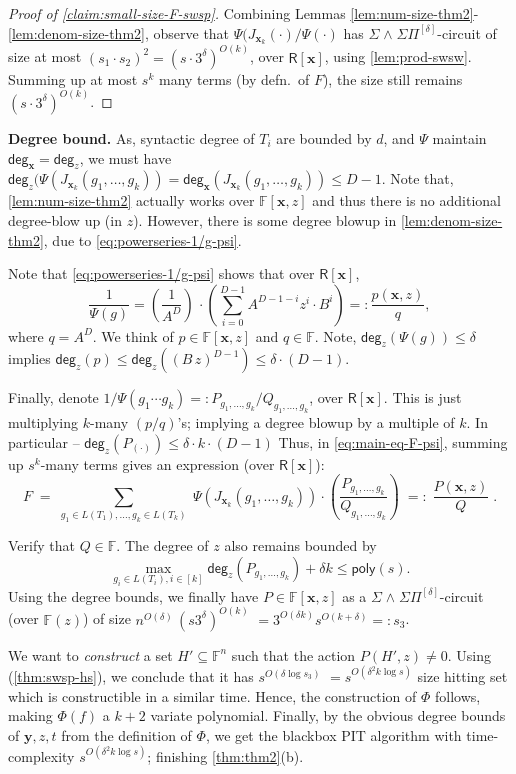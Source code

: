 \documentclass[10pt,a4paper]{article}
\newcommand{\poly}{\mathsf{poly}}
\newcommand{\F}{\mathbb{F}}
\newcommand{\ringR}{\mathsf{R}}
\newcommand{\x}{{\boldsymbol x}}
\newcommand{\y}{{\boldsymbol y}}
\newcommand{\pdeg}{\mathsf{deg}}
\newcommand{\SWSP}[3]{\Sigma^{#1}\!\wedge^{#2}\!\Sigma\Pi^{#3}}
\numberwithin{equation}{section}
\begin{document}
\begin{proof}[Proof of \autoref{claim:small-size-F-swsp}]
Combining Lemmas \ref{lem:num-size-thm2}-\ref{lem:denom-size-thm2}, observe that $\Psi(J_{\x_k}(\cdot)/\Psi(\cdot)$ has $\SWSP{}{}{[\delta]}$-circuit of size at most $(s_1 \cdot s_2)^2 = (s \cdot 3^{\delta})^{O(k)}$, over $\ringR[\x]$, using \autoref{lem:prod-swsw}. Summing up at most $s^k$ many terms (by defn.~of $F$), the size still remains $(s\cdot 3^{\delta})^{O(k)}$.
\end{proof}

{\bf \noindent Degree bound.} As, syntactic degree of $T_i$ are bounded by $d$, and $\Psi$ maintain $\pdeg_{\x}=\pdeg_{z}$, we must have $\pdeg_{z}(\Psi(J_{\x_k}(g_1,\hdots,g_k)) =\pdeg_{\x}(J_{\x_k}(g_1,\hdots,g_k)) \le D-1$. 
%
Note that, \autoref{lem:num-size-thm2} actually works over $\F[\x,z]$ and thus there is no additional degree-blow up (in $z$). However, there is some degree blowup in \autoref{lem:denom-size-thm2}, due to \autoref{eq:powerseries-1/g-psi}.

Note that \autoref{eq:powerseries-1/g-psi} shows that over $\ringR[\x]$,  \[\frac{1}{\Psi(g)} =\left( \frac{1}{A^D} \right)\,\cdot \left(\sum_{i=0}^{D-1} A^{D-1-i}z^{i} \cdot B^i\right) =: \frac{p(\x,z)}{q},\] where $q= A^{D}$. We think of $p \in \F[\x,z]$ and $q \in \F$. 
%
Note, $\pdeg_{z}(\Psi(g)) \le \delta$ implies $\pdeg_{z}(p) \le \pdeg_{z}((B\,z)^{D-1}) \le \delta \cdot (D-1)$. 
%

Finally, denote $1/\Psi(g_1 \cdots g_k)=: P_{g_1,\hdots,g_k}/Q_{g_1,\hdots,g_k}$, over $\ringR[\x]$. This is just multiplying $k$-many $(p/q)$'s; implying a degree blowup by a multiple of $k$. In particular -- $\pdeg_{z}(P_{(\cdot)}) \le \delta \cdot k \cdot (D-1)$
%
%
%
%
%
%
Thus, in \autoref{eq:main-eq-F-psi}, summing up $s^k$-many terms gives an expression (over $\ringR[\x]$):
\[ F \;=\; \sum_{g_1 \in L(T_1),\hdots, g_k \in L(T_k)}\; \Psi(J_{\x_k}(g_1,\hdots,g_k)) \cdot \left( \frac{P_{g_1,\hdots,g_k}}{Q_{g_1,\hdots,g_k}} \right)\;=:\; \frac{P(\x,z)}{Q}\;.\]

Verify that $Q \in \F$.
%
%
The degree of $z$ also remains bounded by \[\max_{g_i \in L(T_i), i\in[k]} \pdeg_{z}(P_{g_1,\hdots,g_k})+\delta k \le \poly(s).\]
%
Using the degree bounds, we finally have $P \in \F[\x,z]$ as a $\SWSP{}{}{[\delta]}$-circuit (over $\F(z)$) of size $n^{O(\delta)}\,(s3^{\delta})^{O(k)}$ $=3^{O(\delta k)} s^{O(k+\delta)} =: s_3$. 

We want to \emph{construct} a set $H' \subseteq \F^n$ such that the action $P(H',z) \ne 0$.  Using \cite{forbes2015deterministic} (\autoref{thm:swsp-hs}), we conclude that it has $s^{O(\delta\log s_3)}$ $= s^{O(\delta^2 k \log s)}$ size hitting set which is constructible in a similar time. 
Hence, the construction of $\Phi$ follows, making $\Phi(f)$ a $k+2$ variate polynomial. Finally, by the obvious degree bounds of $\y,z,t$ from the definition of $\Phi$, we get the blackbox PIT algorithm with time-complexity $s^{O(\delta^2 k \log s)}$; finishing \autoref{thm:thm2}(b).
\end{document}
